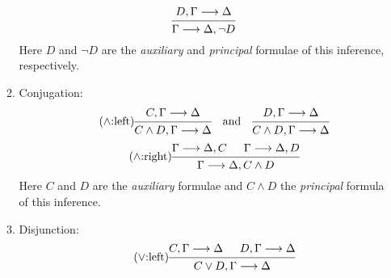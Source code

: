 \documentclass[11pt,a4paper]{article}
\begin{document}
\begin{definition}
\begin{enumerate}
\begin{enumerate}
\begin{equation}
                    \label{eq:lnot:right}
                    \begin{prooftree}
                        \hypo{D, \Gamma\seq\Delta}
                        \infer1{\Gamma\seq\Delta, \lnot D}
                    \end{prooftree}
                \end{equation}
                Here \(D\) and \(\lnot D\) are the \emph{auxiliary} and \emph{principal} formulae
                of this inference, respectively.
            \item\label{it:conjugation} Conjugation:
                \begin{equation}
                    \tag{\(\land\):left}
                    \label{eq:land:left}
                    \begin{prooftree}
                        \hypo{C, \Gamma\seq\Delta}
                        \infer1{C\land D, \Gamma\seq\Delta}
                    \end{prooftree}
                    \quad\text{and}\quad
                    \begin{prooftree}
                        \hypo{D,\Gamma\seq\Delta}
                        \infer1{C\land D, \Gamma\seq\Delta}
                    \end{prooftree}
                \end{equation}
                \begin{equation}
                    \tag{\(\land\):right}
                    \label{eq:land:right}
                    \begin{prooftree}
                        \hypo{\Gamma\seq\Delta, C}
                        \hypo{\Gamma\seq\Delta, D}
                        \infer2{\Gamma\seq\Delta, C\land D}
                    \end{prooftree}
                \end{equation}
                Here \(C\) and \(D\) are the \emph{auxiliary} formulae and \(C\land D\) the \emph{principal} formula
                of this inference.
            \item\label{it:disjunction} Disjunction:
                \begin{equation}
                    \tag{\(\lor\):left}
                    \label{eq:lor:left}
                    \begin{prooftree}
                        \hypo{C, \Gamma\seq\Delta}
                        \hypo{D, \Gamma\seq\Delta}
                        \infer2{C\lor D, \Gamma\seq\Delta}
                    \end{prooftree}

\end{equation}
\end{enumerate}
\end{enumerate}
\end{definition}
\end{document}
